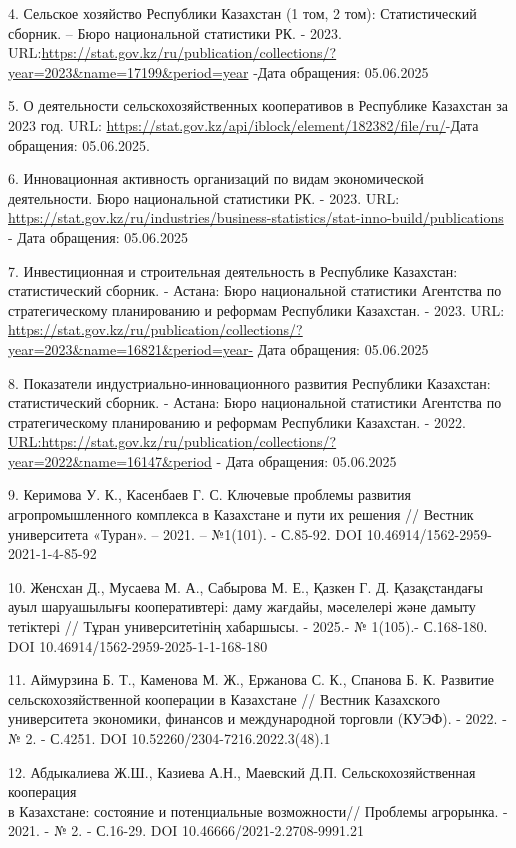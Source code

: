 4. Сельское хозяйство Республики Казахстан (1 том, 2 том):
Статистический сборник. -- Бюро национальной статистики РК. - 2023.
URL:\url{https://stat.gov.kz/ru/publication/collections/?year=2023&name=17199&period=year}
-Дата обращения: 05.06.2025

5. О деятельности сельскохозяйственных кооперативов в Республике
Казахстан за 2023 год. URL:
\url{https://stat.gov.kz/api/iblock/element/182382/file/ru/}-Дата
обращения: 05.06.2025.

6. Инновационная активность организаций по видам экономической
деятельности. Бюро национальной статистики РК. - 2023. URL:
\url{https://stat.gov.kz/ru/industries/business-statistics/stat-inno-build/publications}
- Дата обращения: 05.06.2025

7. Инвестиционная и строительная деятельность в Республике Казахстан:
статистический сборник. - Астана: Бюро национальной статистики Агентства
по стратегическому планированию и реформам Республики Казахстан. - 2023.
URL:
\url{https://stat.gov.kz/ru/publication/collections/?year=2023&name=16821&period=year-}
Дата обращения: 05.06.2025

8. Показатели индустриально-инновационного развития Республики
Казахстан: статистический сборник. - Астана: Бюро национальной
статистики Агентства по стратегическому планированию и реформам
Республики Казахстан. - 2022.
\url{URL:https://stat.gov.kz/ru/publication/collections/?year=2022&name=16147&period}
- Дата обращения: 05.06.2025

9. Керимова У. К., Касенбаев Г. С. Ключевые проблемы развития
агропромышленного комплекса в Казахстане и пути их решения // Вестник
университета «Туран». -- 2021. -- №1(101). - С.85-92. DOI
10.46914/1562-2959-2021-1-4-85-92

10. Женсхан Д., Мусаева М. А., Сабырова М. Е., Қазкен Г. Д.
Қазақстандағы ауыл шаруашылығы кооперативтері: даму жағдайы, мәселелері
және дамыту тетіктері // Тұран университетінің хабаршысы. - 2025.- №
1(105).- С.168-180. DOI 10.46914/1562-2959-2025-1-1-168-180

11. Аймурзина Б. Т., Каменова М. Ж., Ержанова С. К., Спанова Б. К.
Развитие сельскохозяйственной кооперации в Казахстане // Вестник
Казахского университета экономики, финансов и международной торговли
(КУЭФ). - 2022. - № 2. - С.4251. DOI 10.52260/2304-7216.2022.3(48).1

12. Абдыкалиева Ж.Ш., Казиева А.Н., Маевский Д.П. Сельскохозяйственная
кооперация\\
в Казахстане: состояние и потенциальные возможности// Проблемы
агрорынка. - 2021. - № 2. - С.16-29. DOI 10.46666/2021-2.2708-9991.21

